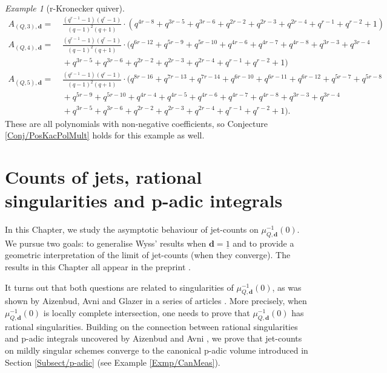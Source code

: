 \documentclass[11pt,english]{article}
\numberwithin{equation}{section}
\numberwithin{figure}{section}
\theoremstyle{definition}
\theoremstyle{plain}
\theoremstyle{remark}
\newtheorem{exmp}[df]{Example}
\newcommand\dd{\mathbf{d}}
\begin{document}
\begin{exmp}[r-Kronecker quiver]
\[\begin{split}
A_{(Q,3),\dd} = & \ \frac{(q^{r-1}-1) (q^{r}-1)}{(q-1)^{2} (q+ 1)}\cdot (q^{4r-8}+q^{3r-5}+q^{3r-6}+q^{2r-2}+q^{2r-3}+q^{2r-4}+q^{r-1}+q^{r-2}+1) \\
A_{(Q,4),\dd} = & \ \frac{(q^{r-1}-1) (q^{r}-1)}{(q-1)^{2} (q+ 1)}\cdot (q^{6r-12}+q^{5r-9}+q^{5r-10}+q^{4r-6}+q^{4r-7}+q^{4r-8}+q^{3r-3}+q^{3r-4} \\
& \ +q^{3r-5}+q^{3r-6}+q^{2r-2}+q^{2r-3}+q^{2r-4}+q^{r-1}+q^{r-2}+1) \\
A_{(Q,5),\dd} = & \ \frac{(q^{r-1}-1) (q^{r}-1)}{(q-1)^{2} (q+ 1)}\cdot (q^{8r-16}+q^{7r-13}+q^{7r-14}+q^{6r-10}+q^{6r-11}+q^{6r-12}+q^{5r-7}+q^{5r-8} \\
& \ +q^{5r-9}+q^{5r-10}+q^{4r-4}+q^{4r-5}+q^{4r-6}+q^{4r-7}+q^{4r-8}+q^{3r-3}+q^{3r-4} \\
& \ +q^{3r-5}+q^{3r-6}+q^{2r-2}+q^{2r-3}+q^{2r-4}+q^{r-1}+q^{r-2}+1) .
\end{split}
\]These are all polynomials with non-negative coefficients, so Conjecture
\ref{Conj/PosKacPolMult} holds for this example as well.

\end{exmp}

\pagebreak{}

\section{Counts of jets, rational singularities and p-adic integrals \label{Chap/RatSg}}

In this Chapter, we study the asymptotic behaviour of jet-counts on
$\mu_{Q,\dd}^{-1}(0)$. We pursue two goals: to generalise Wyss' results
when $\dd=\underline{1}$ \cite{Wys17b} and to provide a geometric
interpretation of the limit of jet-counts (when they converge). The
results in this Chapter all appear in the preprint \cite{Ver22}.

It turns out that both questions are related to singularities of $\mu_{Q,\dd}^{-1}(0)$,
as was shown by Aizenbud, Avni and Glazer in a series of articles
\cite{AA16,AA18,Gla19}. More precisely, when $\mu_{Q,\dd}^{-1}(0)$
is locally complete intersection, one needs to prove that $\mu_{Q,\dd}^{-1}(0)$
has rational singularities. Building on the connection between rational
singularities and p-adic integrals uncovered by Aizenbud and Avni
\cite{AA16}, we prove that jet-counts on mildly singular schemes
converge to the canonical p-adic volume introduced in Section \ref{Subsect/p-adic}
(see Example \ref{Exmp/CanMeas}).
\end{document}
